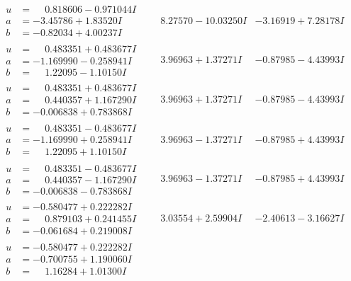 \documentclass[1p]{elsarticle_modified}
\theoremstyle{definition}
\begin{document}
$$\begin{array}{c|c|c}
\begin{aligned}
u &= \phantom{-}0.818606 - 0.971044 I \\
a &= -3.45786 + 1.83520 I \\
b &= -0.82034 + 4.00237 I\end{aligned}
 & \phantom{-}8.27570 - 10.03250 I & -3.16919 + 7.28178 I \\ \hline\begin{aligned}
u &= \phantom{-}0.483351 + 0.483677 I \\
a &= -1.169990 - 0.258941 I \\
b &= \phantom{-}1.22095 - 1.10150 I\end{aligned}
 & \phantom{-}3.96963 + 1.37271 I & -0.87985 - 4.43993 I \\ \hline\begin{aligned}
u &= \phantom{-}0.483351 + 0.483677 I \\
a &= \phantom{-}0.440357 + 1.167290 I \\
b &= -0.006838 + 0.783868 I\end{aligned}
 & \phantom{-}3.96963 + 1.37271 I & -0.87985 - 4.43993 I \\ \hline\begin{aligned}
u &= \phantom{-}0.483351 - 0.483677 I \\
a &= -1.169990 + 0.258941 I \\
b &= \phantom{-}1.22095 + 1.10150 I\end{aligned}
 & \phantom{-}3.96963 - 1.37271 I & -0.87985 + 4.43993 I \\ \hline\begin{aligned}
u &= \phantom{-}0.483351 - 0.483677 I \\
a &= \phantom{-}0.440357 - 1.167290 I \\
b &= -0.006838 - 0.783868 I\end{aligned}
 & \phantom{-}3.96963 - 1.37271 I & -0.87985 + 4.43993 I \\ \hline\begin{aligned}
u &= -0.580477 + 0.222282 I \\
a &= \phantom{-}0.879103 + 0.241455 I \\
b &= -0.061684 + 0.219008 I\end{aligned}
 & \phantom{-}3.03554 + 2.59904 I & -2.40613 - 3.16627 I \\ \hline\begin{aligned}
u &= -0.580477 + 0.222282 I \\
a &= -0.700755 + 1.190060 I \\
b &= \phantom{-}1.16284 + 1.01300 I\end{aligned}

\end{array}$$
\end{document}
